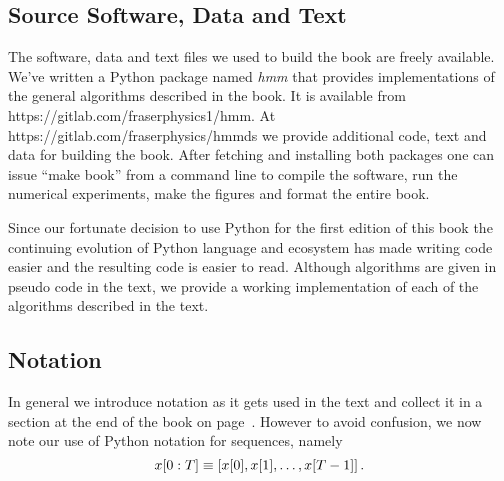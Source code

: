 \documentclass[ltxbook,showlabels, commentsvisible]{hmmdsbook}
\begin{document}

\subsection*{Source Software, Data and Text}
\label{preface_software}

The software, data and text files we used to build the book are freely
available.  We've written a Python package named \emph{hmm} that
provides implementations of the general algorithms described in the
book.  It is available from https://gitlab.com/fraserphysics1/hmm.  At
https://gitlab.com/fraserphysics/hmmds we provide additional code,
text and data for building the book.  After fetching and installing
both packages one can issue ``make book'' from a command line to
compile the software, run the numerical experiments, make the figures
and format the entire book.  

Since our fortunate decision to use Python for the first edition of
this book the continuing evolution of Python language and ecosystem
has made writing code easier and the resulting code is easier to read.
Although algorithms are given in pseudo code in the text, we provide a
working implementation of each of the algorithms described in the
text.

\subsection*{Notation}
\label{preface_notation}

In general we introduce notation as it gets used in the text and
collect it in a section at the end of the book on page~\pageref{sec:notation}.  However to avoid confusion, we now note our
use of Python notation for sequences, namely
\begin{equation*}
  x[0:T] \equiv \left[ x[0], x[1], \ldots, x[T-1] \right].
\end{equation*}
\end{document}
